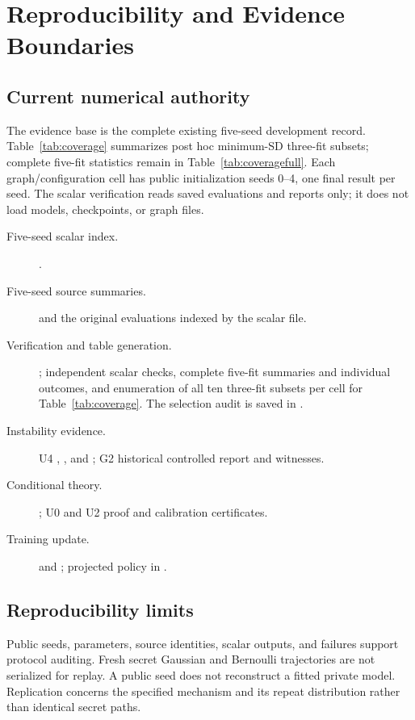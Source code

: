 \chapter{Reproducibility and Evidence Boundaries}\label{app:evidence}
\section{Current numerical authority}
The evidence base is the complete existing five-seed development record. Table~\ref{tab:coverage} summarizes post hoc minimum-SD three-fit subsets; complete five-fit statistics remain in Table~\ref{tab:coveragefull}. Each graph/configuration cell has public initialization seeds 0--4, one final result per seed. The scalar verification reads saved evaluations and reports only; it does not load models, checkpoints, or graph files.

\begingroup\small\raggedright
\begin{description}
\item[Five-seed scalar index.] .
\item[Five-seed source summaries.]  and the original evaluations indexed by the scalar file.
\item[Verification and table generation.] ; independent scalar checks, complete five-fit summaries and individual outcomes, and enumeration of all ten three-fit subsets per cell for Table~\ref{tab:coverage}. The selection audit is saved in .
\item[Instability evidence.] U4 , , and ; G2 historical controlled report and witnesses.
\item[Conditional theory.] ; U0 and U2 proof and calibration certificates.
\item[Training update.]  and ; projected policy in .
\end{description}
\endgroup

\section{Reproducibility limits}
Public seeds, parameters, source identities, scalar outputs, and failures support protocol auditing. Fresh secret Gaussian and Bernoulli trajectories are not serialized for replay. A public seed does not reconstruct a fitted private model. Replication concerns the specified mechanism and its repeat distribution rather than identical secret paths.

